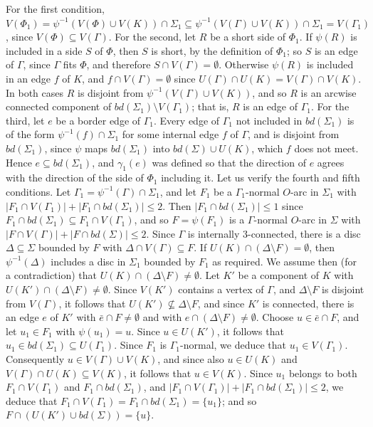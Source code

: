{For the first condition, $V(\Phi_1) = \psi^{-1}(V(\Phi) \cup V(K)) \cap \Sigma_1 \subseteq \psi^{-1}(V(\Gamma) \cup V(K)) \cap \Sigma_1 = V(\Gamma_1)$, since $V(\Phi) \subseteq V(\Gamma)$. For the second, let $R$ be a short side of $\Phi_1$. If $\psi(R)$ is included in a side $S$ of $\Phi$, then $S$ is short, by the definition of $\Phi_1$; so $S$ is an edge of $\Gamma$, since $\Gamma$ fits $\Phi$, and therefore $S \cap V(\Gamma) = \emptyset$. Otherwise $\psi(R)$ is included in an edge $f$ of $K$, and $f \cap V(\Gamma) = \emptyset$ since $U(\Gamma) \cap U(K) = V(\Gamma) \cap V(K)$. In both cases $R$ is disjoint from $\psi^{-1}(V(\Gamma) \cup V(K))$, and so $R$ is an arcwise connected component of $bd(\Sigma_1) \setminus V(\Gamma_1)$; that is, $R$ is an edge of $\Gamma_1$. For the third, let $e$ be a border edge of $\Gamma_1$. Every edge of $\Gamma_1$ not included in $bd(\Sigma_1)$ is of the form $\psi^{-1}(f) \cap \Sigma_1$ for some internal edge $f$ of $\Gamma$, and is disjoint from $bd(\Sigma_1)$, since $\psi$ maps $bd(\Sigma_1)$ into $bd(\Sigma) \cup U(K)$, which $f$ does not meet. Hence $e \subseteq bd(\Sigma_1)$, and $\gamma_1(e)$ was defined so that the direction of $e$ agrees with the direction of the side of $\Phi_1$ including it.} Let us verify the fourth and fifth conditions. Let $\Gamma_1 = \psi^{-1}(\Gamma) \cap \Sigma_1$, and let $F_1$ be a $\Gamma_1$-normal $O$-arc in $\Sigma_1$ with $|F_1 \cap V(\Gamma_1)| + |F_1 \cap bd(\Sigma_1)| \le 2$. Then $|F_1 \cap bd(\Sigma_1)| \le 1$ since $F_1 \cap bd(\Sigma_1) \subseteq F_1 \cap V(\Gamma_1)$, and so $F = \psi(F_1)$ is a $\Gamma$-normal $O$-arc in $\Sigma$ with $|F \cap V(\Gamma)| + |F \cap bd(\Sigma)| \le 2$. Since $\Gamma$ is internally 3-connected, there is a disc $\Delta \subseteq \Sigma$ bounded by $F$ with $\Delta \cap V(\Gamma) \subseteq F$. If $U(K) \cap (\Delta \setminus F) = \emptyset$, then $\psi^{-1}(\Delta)$ includes a disc in $\Sigma_1$ bounded by $F_1$ as required. We assume then (for a contradiction) that $U(K) \cap (\Delta \setminus F) \ne \emptyset$. Let $K'$ be a component of $K$ with $U(K') \cap (\Delta \setminus F) \ne \emptyset$. Since $V(K')$ contains a vertex of $\Gamma$, and $\Delta \setminus F$ is disjoint from $V(\Gamma)$, it follows that $U(K') \nsubseteq \Delta \setminus F$, and since $K'$ is connected, there is an edge $e$ of $K'$ with $\bar{e} \cap F \ne \emptyset$ and with $e \cap (\Delta \setminus F) \ne \emptyset$. Choose $u \in \bar{e} \cap F$, and let $u_1 \in F_1$ with $\psi(u_1) = u$. Since $u \in U(K')$, it follows that $u_1 \in bd(\Sigma_1) \subseteq U(\Gamma_1)$. Since $F_1$ is $\Gamma_1$-normal, we deduce that $u_1 \in V(\Gamma_1)$. Consequently $u \in V(\Gamma) \cup V(K)$, and since also $u \in U(K)$ and $V(\Gamma) \cap U(K) \subseteq V(K)$, it follows that $u \in V(K)$. Since $u_1$ belongs to both $F_1 \cap V(\Gamma_1)$ and $F_1 \cap bd(\Sigma_1)$, and $|F_1 \cap V(\Gamma_1)| + |F_1 \cap bd(\Sigma_1)| \le 2$, we deduce that $F_1 \cap V(\Gamma_1) = F_1 \cap bd(\Sigma_1) = \{u_1\}$; and so $F \cap (U(K') \cup bd(\Sigma)) = \{u\}$.

